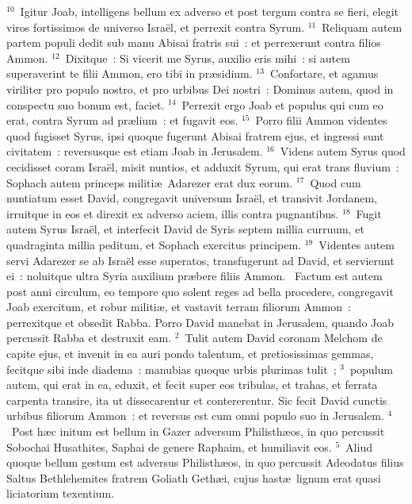 ${}^{10}$~Igitur Joab, intelligens bellum ex adverso et post tergum contra se fieri, elegit viros fortissimos de universo Isra\"el, et perrexit contra Syrum.
${}^{11}$~Reliquam autem partem populi dedit sub manu Abisai fratris sui~: et perrexerunt contra filios Ammon.
${}^{12}$~Dixitque~: Si vicerit me Syrus, auxilio eris mihi~: si autem superaverint te filii Ammon, ero tibi in pr\ae sidium.
${}^{13}$~Confortare, et agamus viriliter pro populo nostro, et pro urbibus Dei nostri~: Dominus autem, quod in conspectu suo bonum est, faciet.
${}^{14}$~Perrexit ergo Joab et populus qui cum eo erat, contra Syrum ad pr\ae lium~: et fugavit eos.
${}^{15}$~Porro filii Ammon videntes quod fugisset Syrus, ipsi quoque fugerunt Abisai fratrem ejus, et ingressi sunt civitatem~: reversusque est etiam Joab in Jerusalem.
${}^{16}$~Videns autem Syrus quod cecidisset coram Isra\"el, misit nuntios, et adduxit Syrum, qui erat trans fluvium~: Sophach autem princeps militi\ae\ Adarezer erat dux eorum.
${}^{17}$~Quod cum nuntiatum esset David, congregavit universum Isra\"el, et transivit Jordanem, irruitque in eos et direxit ex adverso aciem, illis contra pugnantibus.
${}^{18}$~Fugit autem Syrus Isra\"el, et interfecit David de Syris septem millia curruum, et quadraginta millia peditum, et Sophach exercitus principem.
${}^{19}$~Videntes autem servi Adarezer se ab Isra\"el esse superatos, transfugerunt ad David, et servierunt ei~: noluitque ultra Syria auxilium pr\ae bere filiis Ammon.
~\lettrine[lines=10,image=true,loversize=0.05,lraise=-0.03]{F}{}actum est autem post anni circulum, eo tempore quo solent reges ad bella procedere, congregavit Joab exercitum, et robur militi\ae , et vastavit terram filiorum Ammon~: perrexitque et obsedit Rabba. Porro David manebat in Jerusalem, quando Joab percussit Rabba et destruxit eam.
${}^{2}$~Tulit autem David coronam Melchom de capite ejus, et invenit in ea auri pondo talentum, et pretiosissimas gemmas, fecitque sibi inde diadema~: manubias quoque urbis plurimas tulit~;
${}^{3}$~populum autem, qui erat in ea, eduxit, et fecit super eos tribulas, et trahas, et ferrata carpenta transire, ita ut dissecarentur et contererentur. Sic fecit David cunctis urbibus filiorum Ammon~: et reversus est cum omni populo suo in Jerusalem.
${}^{4}$~Post h\ae c initum est bellum in Gazer adversum Philisth\ae os, in quo percussit Sobochai Husathites, Saphai de genere Raphaim, et humiliavit eos.
${}^{5}$~Aliud quoque bellum gestum est adversus Philisth\ae os, in quo percussit Adeodatus filius Saltus Bethlehemites fratrem Goliath Geth\ae i, cujus hast\ae\ lignum erat quasi liciatorium texentium.
